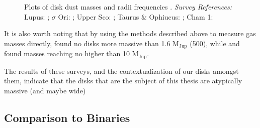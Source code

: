


\begin{figure}[h!]
  \centering
    \hspace*{\fill}%
    \hspace*{\fill}%
    \caption{Plots of disk dust masses and radii frequencies \citep{Eisner2018}. \textit{Survey References:} Lupus: \citet{Tazzari2017}; $\sigma$ Ori: \citet{Ansdell2017}; Upper Sco: \citet{Barenfeld2017}; Taurus \& Ophiucus: \citet{Tripathi2017}; Cham 1: \citet{Pascucci2016}}
    \label{fig:eisner18_disk_properties}
\end{figure}


It is also worth noting that by using the methods described above to measure gas masses directly, \citet{Miotello2017} found no disks more massive than 1.6 M$_\text{Jup}$ (500), while \citet{Ansdell2016} and \citet{Ansdell2018} found masses reaching no higher than 10 M$_\text{Jup}$.


The results of these surveys, and the contextualization of our disks amongst them, indicate that the disks that are the subject of this thesis are atypically massive (and maybe wide)




\subsection{Comparison to Binaries}





